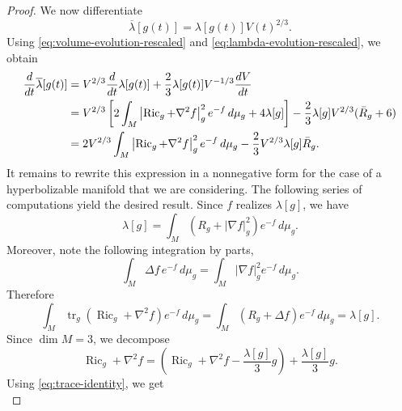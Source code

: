 \documentclass{amsart}
\begin{document}
\begin{proof}
\noindent We now differentiate
\[
        \overline{\lambda}[g(t)]
        =
        \lambda[g(t)]V(t)^{2/3}.
\]
Using \eqref{eq:volume-evolution-rescaled} and
\eqref{eq:lambda-evolution-rescaled}, we obtain
\begin{align}
        \frac{d}{dt}\overline{\lambda}[g(t)]
        &=
        V^{2/3}\frac{d}{dt}\lambda[g(t)]
        +
        \frac{2}{3}\lambda[g(t)]V^{-1/3}\frac{dV}{dt} \notag \\
        &=
        V^{2/3}
        \left[
                2\int_M
                \left|
                        \operatorname{Ric}_g+\nabla^2 f
                \right|_g^2
                e^{-f}\,d\mu_g
                +
                4\lambda[g]
        \right]
        -
        \frac{2}{3}\lambda[g]V^{2/3}(\bar R_g+6)\\
       & =
        2V^{2/3}
        \int_M
        \left|
                \operatorname{Ric}_g+\nabla^2 f
        \right|_g^2
        e^{-f}\,d\mu_g
        -
        \frac{2}{3}V^{2/3}\lambda[g]\bar R_g.
\end{align}
It remains to rewrite this expression in a nonnegative form for the case of a hyperbolizable manifold that we are considering. The following series of computations yield the desired result. Since \(f\)
realizes \(\lambda[g]\), we have
\begin{equation}
\label{eq:lambda-f-form}
        \lambda[g]
        =
        \int_M
        \left(
                R_g+|\nabla f|_g^2
        \right)
        e^{-f}\,d\mu_g .
\end{equation}
Moreover, note the following integration by parts,
\begin{equation}
\label{eq:laplacian-f-identity}
        \int_M \Delta f\,e^{-f}\,d\mu_g
        =
        \int_M |\nabla f|_g^2 e^{-f}\,d\mu_g .
\end{equation}
Therefore
\begin{equation}
\label{eq:trace-identity}
        \int_M
        \operatorname{tr}_g
        \left(
                \operatorname{Ric}_g+\nabla^2 f
        \right)
        e^{-f}\,d\mu_g
        =
        \int_M
        (R_g+\Delta f)e^{-f}\,d\mu_g
        =
        \lambda[g].
\end{equation}
Since \(\dim M=3\), we decompose
\[
        \operatorname{Ric}_g+\nabla^2 f
        =
        \left(
                \operatorname{Ric}_g+\nabla^2 f
                -
                \frac{\lambda[g]}{3}g
        \right)
        +
        \frac{\lambda[g]}{3}g.
\]
Using \eqref{eq:trace-identity}, we get
\begin{equation}

\end{equation}
\end{proof}
\end{document}
